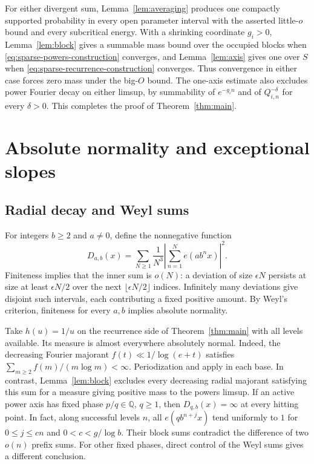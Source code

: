 \documentclass[11pt,a4paper,reqno]{amsart}
\theoremstyle{definition}
\theoremstyle{remark}
\numberwithin{equation}{section}
\begin{document}
For either divergent sum, Lemma~\ref{lem:averaging} produces one compactly supported probability in every open parameter interval with the asserted little-\(o\) bound and every subcritical energy. With a shrinking coordinate \(g_i>0\), Lemma~\ref{lem:block} gives a summable mass bound over the occupied blocks when \eqref{eq:sparse-powers-construction} converges, and Lemma~\ref{lem:axis} gives one over \(S\) when \eqref{eq:sparse-recurrence-construction} converges. Thus convergence in either case forces zero mass under the big-\(O\) bound. The one-axis estimate also excludes power Fourier decay on either limsup, by summability of \(e^{-g_i n}\) and of \(Q_{i,n}^{-\delta}\) for every \(\delta>0\). This completes the proof of Theorem~\ref{thm:main}.
\section{Absolute normality and exceptional slopes}\label{sec:normal}
\subsection{Radial decay and Weyl sums}
For integers \(b\ge2\) and \(a\ne0\), define the nonnegative function
\[
 D_{a,b}(x)=\sum_{N\ge1}\frac1{N^3}
       \left|\sum_{n=1}^N e(ab^nx)\right|^2 .
\]
Finiteness implies that the inner sum is \(o(N)\): a deviation of size
\(\epsilon N\) persists at size at least \(\epsilon N/2\) over the
next \(\lfloor\epsilon N/2\rfloor\) indices. Infinitely many
deviations give disjoint such intervals, each contributing a fixed
positive amount. By Weyl's criterion, finiteness for every \(a,b\)
implies absolute normality.

Take \(h(u)=1/u\) on the recurrence side of Theorem~\ref{thm:main}
with all levels available. Its measure is almost everywhere
absolutely normal. Indeed, the decreasing Fourier majorant
\(f(t)\ll1/\log(e+t)\) satisfies \(\sum_{m\ge2}f(m)/(m\log m)<\infty\).
Periodization and \cite[Corollary DEL and Appendix A]{PVZZ} apply
in each base. In contrast, Lemma~\ref{lem:block} excludes every
decreasing radial majorant satisfying this sum for a measure giving
positive mass to the powers limsup. If an active power axis has fixed
phase \(p/q\in\mathbb Q\), \(q\ge1\), then \(D_{q,b}(x)=\infty\)
at every hitting point. In fact, along successful levels \(n\), all
\(e(qb^{n+j}x)\) tend uniformly to \(1\) for \(0\le j\le cn\)
and \(0<c<g/\log b\). Their block sums contradict the difference
of two \(o(n)\) prefix sums. For other fixed phases, direct control
of the Weyl sums gives a different conclusion.
\end{document}
